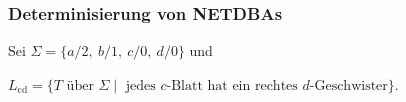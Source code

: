  \newcommand{\empha}[3]{%
    \only<#1|handout:0>{\rule[-10pt]{0pt}{1pt}#3}%
    \only<#2>{\rule[-10pt]{0pt}{1pt}\dred{\uwave{#3}}}%
  }
    \begin{frame}
      \frametitle{Determinisierung von NETDBAs}
      
      \quad Sei $\Sigma = \{a/2,~ b/1,~ c/0,~ d/0\}$ und
      \par\smallskip
      $L_{\text{cd}} = \{T \text{~über~} \Sigma \mid \text{~jedes $c$-Blatt hat ein rechtes $d$-Geschwister}\}$.
% 
\end{frame}
